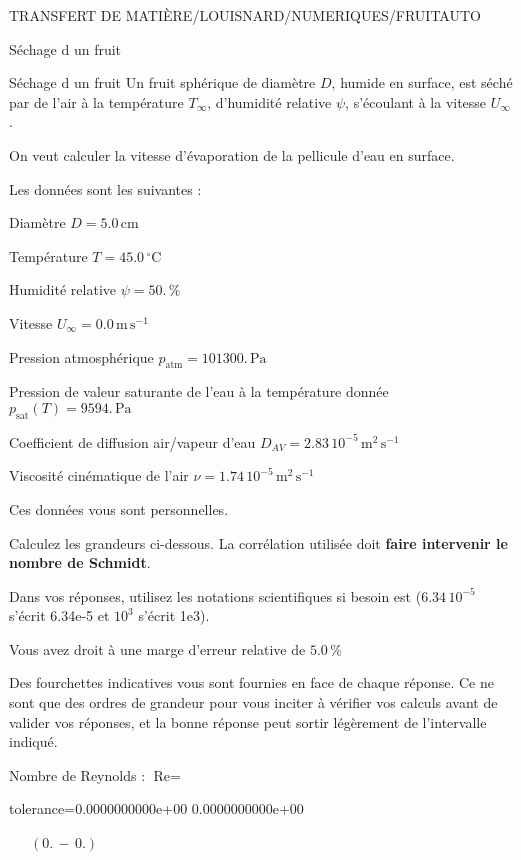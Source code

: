 \documentclass[12pt]{article}
\begin{document}
\begin{quiz}{TRANSFERT DE MATIÈRE/LOUISNARD/NUMERIQUES/FRUITAUTO}
\begin{cloze}{Séchage d un fruit}
\end{cloze} 


 \begin{cloze}{Séchage d un fruit} 
Un fruit sphérique de diamètre $D$, humide en surface, est séché par de l'air à la température $T_\infty$, d'humidité relative $\psi$, s'écoulant à la vitesse $U_\infty$.

On veut calculer la vitesse d'évaporation de la pellicule d'eau en surface.

 

Les données sont les suivantes :

 

Diamètre $D = 5.0\,  \mathrm{cm} $

Température $T = 45.0\,  \mathrm{^\circ\mathrm{C}} $

Humidité relative $\psi = 50.\, \% $

Vitesse $U_\infty = 0.0\,  \mathrm{m}\,  \mathrm{s}^{-1} $

Pression atmosphérique $p_{\text{atm}} = 101300.\,  \mathrm{Pa} $

Pression de valeur saturante de l’eau à la température donnée $p_{\text{sat}}(T) = 9594.\,  \mathrm{Pa} $

Coefficient de diffusion air/vapeur d’eau $D_{AV} =  2.83 \, 10^{-5} \,  \mathrm{m}^{2}\,  \mathrm{s}^{-1} $

Viscosité cinématique de l’air $\nu =  1.74 \, 10^{-5} \,  \mathrm{m}^{2}\,  \mathrm{s}^{-1} $

Ces données vous sont personnelles.

 

Calculez les grandeurs ci-dessous. La corrélation utilisée doit \textbf{faire intervenir le nombre de Schmidt}.

Dans vos réponses, utilisez les notations scientifiques si besoin est ($6.34\, 10^{-5}$ s'écrit 6.34e-5 et $10^{3}$ s'écrit 1e3).

Vous avez droit à une marge d'erreur relative de $5.0\, \% $

Des fourchettes indicatives vous sont fournies en face de chaque réponse. Ce ne sont que des ordres de grandeur pour vous inciter à vérifier vos calculs avant de valider vos réponses, et la bonne réponse peut sortir légèrement de l'intervalle indiqué.

 

Nombre de Reynolds : $\text{Re} =  $
\begin{numerical}[points=1] 
\item[tolerance={0.0000000000e+00}] 0.0000000000e+00 
\end{numerical} 
 $\,$ 
 $ \quad (0. \, - \, 0.) $ 


\end{cloze}
\end{quiz}
\end{document}

